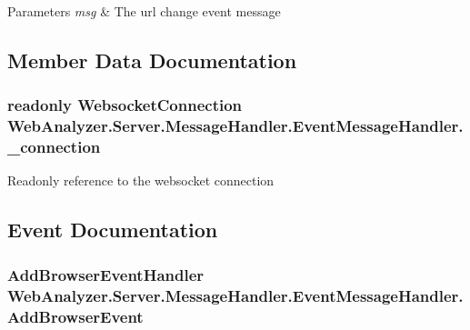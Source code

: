 \begin{DoxyParams}{Parameters}
{\em msg} & The url change event message\\
\hline
\end{DoxyParams}


\subsection{Member Data Documentation}
\hypertarget{class_web_analyzer_1_1_server_1_1_message_handler_1_1_event_message_handler_ab818f2be9cb81fd8854221cc1906d736}{}
\subsubsection[{\+\_\+connection}]{\setlength{\rightskip}{0pt plus 5cm}readonly {\bf Websocket\+Connection} Web\+Analyzer.\+Server.\+Message\+Handler.\+Event\+Message\+Handler.\+\_\+connection\hspace{0.3cm}{\ttfamily [private]}}\label{class_web_analyzer_1_1_server_1_1_message_handler_1_1_event_message_handler_ab818f2be9cb81fd8854221cc1906d736}


Readonly reference to the websocket connection 



\subsection{Event Documentation}
\hypertarget{class_web_analyzer_1_1_server_1_1_message_handler_1_1_event_message_handler_ab5371d9836863ebc41e4c86c9ebc348e}{}
\subsubsection[{Add\+Browser\+Event}]{\setlength{\rightskip}{0pt plus 5cm}Add\+Browser\+Event\+Handler Web\+Analyzer.\+Server.\+Message\+Handler.\+Event\+Message\+Handler.\+Add\+Browser\+Event}\label{class_web_analyzer_1_1_server_1_1_message_handler_1_1_event_message_handler_ab5371d9836863ebc41e4c86c9ebc348e}


